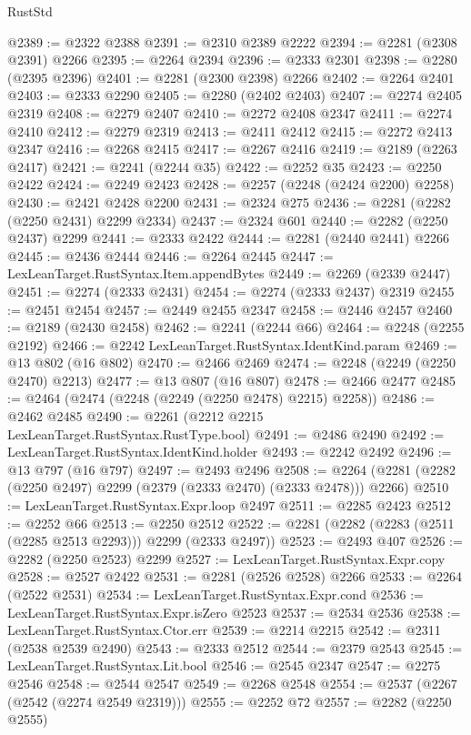 \begin{lexlean}{RustStd}
\begin{coremodule}
@2389 := @2322 @2388
@2391 := @2310 @2389 @2222
@2394 := @2281 (@2308 @2391) @2266
@2395 := @2264 @2394
@2396 := @2333 @2301
@2398 := @2280 (@2395 @2396)
@2401 := @2281 (@2300 @2398) @2266
@2402 := @2264 @2401
@2403 := @2333 @2290
@2405 := @2280 (@2402 @2403)
@2407 := @2274 @2405 @2319
@2408 := @2279 @2407
@2410 := @2272 @2408 @2347
@2411 := @2274 @2410
@2412 := @2279 @2319
@2413 := @2411 @2412
@2415 := @2272 @2413 @2347
@2416 := @2268 @2415
@2417 := @2267 @2416
@2419 := @2189 (@2263 @2417)
@2421 := @2241 (@2244 @35)
@2422 := @2252 @35
@2423 := @2250 @2422
@2424 := @2249 @2423
@2428 := @2257 (@2248 (@2424 @2200) @2258)
@2430 := @2421 @2428 @2200
@2431 := @2324 @275
@2436 := @2281 (@2282 (@2250 @2431) @2299 @2334)
@2437 := @2324 @601
@2440 := @2282 (@2250 @2437) @2299
@2441 := @2333 @2422
@2444 := @2281 (@2440 @2441) @2266
@2445 := @2436 @2444
@2446 := @2264 @2445
@2447 := LexLeanTarget.RustSyntax.Item.appendBytes
@2449 := @2269 (@2339 @2447)
@2451 := @2274 (@2333 @2431)
@2454 := @2274 (@2333 @2437) @2319
@2455 := @2451 @2454
@2457 := @2449 @2455 @2347
@2458 := @2446 @2457
@2460 := @2189 (@2430 @2458)
@2462 := @2241 (@2244 @66)
@2464 := @2248 (@2255 @2192)
@2466 := @2242 LexLeanTarget.RustSyntax.IdentKind.param
@2469 := @13 @802 (@16 @802)
@2470 := @2466 @2469
@2474 := @2248 (@2249 (@2250 @2470) @2213)
@2477 := @13 @807 (@16 @807)
@2478 := @2466 @2477
@2485 := @2464 (@2474 (@2248 (@2249 (@2250 @2478) @2215) @2258))
@2486 := @2462 @2485
@2490 := @2261 (@2212 @2215 LexLeanTarget.RustSyntax.RustType.bool)
@2491 := @2486 @2490
@2492 := LexLeanTarget.RustSyntax.IdentKind.holder
@2493 := @2242 @2492
@2496 := @13 @797 (@16 @797)
@2497 := @2493 @2496
@2508 := @2264 (@2281 (@2282 (@2250 @2497) @2299 (@2379 (@2333 @2470) (@2333 @2478))) @2266)
@2510 := LexLeanTarget.RustSyntax.Expr.loop @2497
@2511 := @2285 @2423
@2512 := @2252 @66
@2513 := @2250 @2512
@2522 := @2281 (@2282 (@2283 (@2511 (@2285 @2513 @2293))) @2299 (@2333 @2497))
@2523 := @2493 @407
@2526 := @2282 (@2250 @2523) @2299
@2527 := LexLeanTarget.RustSyntax.Expr.copy
@2528 := @2527 @2422
@2531 := @2281 (@2526 @2528) @2266
@2533 := @2264 (@2522 @2531)
@2534 := LexLeanTarget.RustSyntax.Expr.cond
@2536 := LexLeanTarget.RustSyntax.Expr.isZero @2523
@2537 := @2534 @2536
@2538 := LexLeanTarget.RustSyntax.Ctor.err
@2539 := @2214 @2215
@2542 := @2311 (@2538 @2539 @2490)
@2543 := @2333 @2512
@2544 := @2379 @2543
@2545 := LexLeanTarget.RustSyntax.Lit.bool
@2546 := @2545 @2347
@2547 := @2275 @2546
@2548 := @2544 @2547
@2549 := @2268 @2548
@2554 := @2537 (@2267 (@2542 (@2274 @2549 @2319)))
@2555 := @2252 @72
@2557 := @2282 (@2250 @2555)

\end{coremodule}
\end{lexlean}
